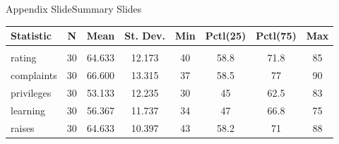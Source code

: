 \documentclass[aspectratio=169,t,11pt,table]{beamer}
\begin{document}
\begin{frame}{Appendix Slide}{Summary Slides}\label{appendix1}
  \begin{table}[t]
    \begin{adjustbox}{width = 0.8\textwidth}
      \begin{tabular}{@{} lccccccc @{}} 
        \toprule
        Statistic & \multicolumn{1}{c}{N} & \multicolumn{1}{c}{Mean} & \multicolumn{1}{c}{St. Dev.} & \multicolumn{1}{c}{Min} & \multicolumn{1}{c}{Pctl(25)} & \multicolumn{1}{c}{Pctl(75)} & \multicolumn{1}{c}{Max} \\ 
        \hline \\[-1.8ex] 
        rating & 30 & 64.633 & 12.173 & 40 & 58.8 & 71.8 & 85 \\ 
        complaints & 30 & 66.600 & 13.315 & 37 & 58.5 & 77 & 90 \\ 
        privileges & 30 & 53.133 & 12.235 & 30 & 45 & 62.5 & 83 \\ 
        learning & 30 & 56.367 & 11.737 & 34 & 47 & 66.8 & 75 \\ 
        raises & 30 & 64.633 & 10.397 & 43 & 58.2 & 71 & 88 \\ 
        \bottomrule
      \end{tabular} 
    \end{adjustbox}
    
  \end{table}

\end{frame}
\end{document}
